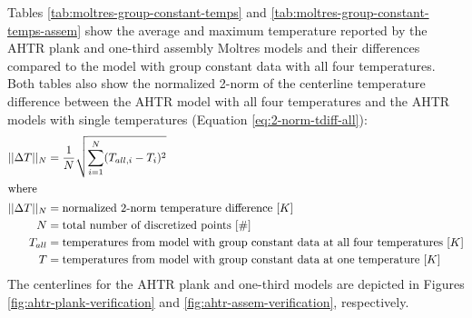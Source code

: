 Tables \ref{tab:moltres-group-constant-temps} and 
\ref{tab:moltres-group-constant-temps-assem}
show the average and maximum temperature reported by the \gls{AHTR} plank and one-third 
assembly Moltres models and their differences compared to the model with group constant data 
with all four temperatures. 
Both tables also show the normalized 2-norm of the centerline temperature difference 
between the \gls{AHTR} model with all four temperatures and the \gls{AHTR} models with single 
temperatures (Equation \ref{eq:2-norm-tdiff-all}):
\begin{align}
    \label{eq:2-norm-tdiff-all}
    ||\Delta T||_N &= \frac{1}{N}\sqrt{\sum_{i=1}^N(T_{all, i} - T_{i})^2} \\
\intertext{where}
    ||\Delta T||_N &= \mbox{normalized 2-norm temperature difference } [K]\nonumber \\
    N &= \mbox{total number of discretized points } [\#] \nonumber \\
    T_{all} &= \mbox{temperatures from model with group constant data at all four temperatures } [K] \nonumber \\
    T &= \mbox{temperatures from model with group constant data at one temperature } [K] \nonumber 
\end{align}
The centerlines for the \gls{AHTR} plank and one-third models are depicted in Figures 
\ref{fig:ahtr-plank-verification} and \ref{fig:ahtr-assem-verification}, respectively. 

